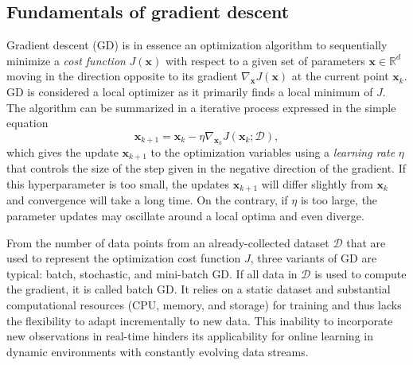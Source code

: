 
\subsection{Fundamentals of gradient descent}
Gradient descent (GD) is in essence an optimization algorithm to sequentially minimize a \emph{cost function} $J(\bm{x})$ with respect to a given set of parameters $\bm{x} \in \mathbb{R}^d$ moving in the direction opposite to its gradient $\nabla_{\bm{x}}J(\bm{x})$ at the current point $\bm{x}_k$. GD is considered a local optimizer as it primarily finds a local minimum of $J$. The algorithm can be summarized in a iterative process expressed in the simple equation
\begin{equation}\label{eq:gradient_descent}
	\bm{x}_{k+1} = \bm{x}_k - \eta  \nabla_{\bm{x}_k} J(\bm{x}_k;\mathcal{D}),
\end{equation}  
which gives the update $\bm{x}_{k+1}$ to the optimization variables using a \emph{learning rate} $\eta$ that controls the size of the step given in the negative direction of the gradient. If this hyperparameter is too small, the updates $\bm{x}_{k+1}$ will differ slightly from $\bm{x}_k$ and convergence will take a long time. On the contrary, if $\eta$ is too large, the parameter updates may oscillate around a local optima and even diverge. 

From the number of data points from an already-collected dataset $\mathcal{D}$ that are used to represent the optimization cost function $J$, three variants of GD are typical: batch, stochastic, and mini-batch GD. If all data in $\mathcal{D}$ is used to compute the gradient, it is called batch GD. It relies on a static dataset and substantial computational resources (CPU, memory, and storage) for training and thus lacks the flexibility to adapt incrementally to new data. This inability to incorporate new observations in real-time hinders its applicability for online learning in dynamic environments with constantly evolving data streams. 

